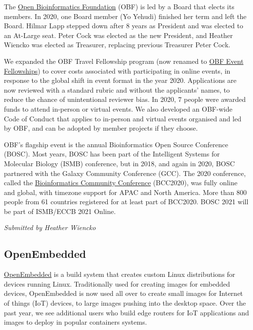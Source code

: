 \documentclass[a4paper]{report}
\begin{document}
The \href{https://www.open-bio.org/}{Open Bioinformatics Foundation} (OBF) is led by a Board that elects its members. In 2020, one Board member (Yo Yehudi) finished her term and left the Board. Hilmar Lapp stepped down after 8 years as President and was elected to an At-Large seat. Peter Cock was elected as the new President, and Heather Wiencko was elected as Treasurer, replacing previous Treasurer Peter Cock.

We expanded the OBF Travel Fellowship program (now renamed to \href{https://www.open-bio.org/event-awards/}{OBF Event Fellowships}) to cover costs associated with participating in online events, in response to the global shift in event format in the year 2020.  Applications are now reviewed with a standard rubric and without the applicants' names, to reduce the chance of unintentional reviewer bias. In 2020, 7 people were awarded funds to attend in-person or virtual events. We also developed an OBF-wide Code of Conduct that applies to in-person and virtual events organised and led by OBF, and can be adopted by member projects if they choose.

OBF's flagship event is the annual Bioinformatics Open Source Conference (BOSC). Most years, BOSC has been part of the Intelligent Systems for Molecular Biology (ISMB) conference, but in 2018, and again in 2020, BOSC partnered with the Galaxy Community Conference (GCC). The 2020 conference, called the \href{https://bcc2020.github.io/}{Bioinformatics Community Conference} (BCC2020), was fully online and global, with timezone support for APAC and North America. More than 800 people from 61 countries registered for at least part of BCC2020. BOSC 2021 will be part of ISMB/ECCB 2021 Online.

{\em Submitted by Heather Wiencko}

\subsection{OpenEmbedded}

\href{https://www.openembedded.org/}{OpenEmbedded} is a build system that creates custom Linux distributions for devices running Linux. Traditionally used for creating images for embedded devices, OpenEmbedded is now used all over to create small images for Internet of things (IoT) devices, to large images pushing into the desktop space.  Over the past year, we see additional users who build edge routers for IoT applications and images to deploy in popular containers systems.
\end{document}
